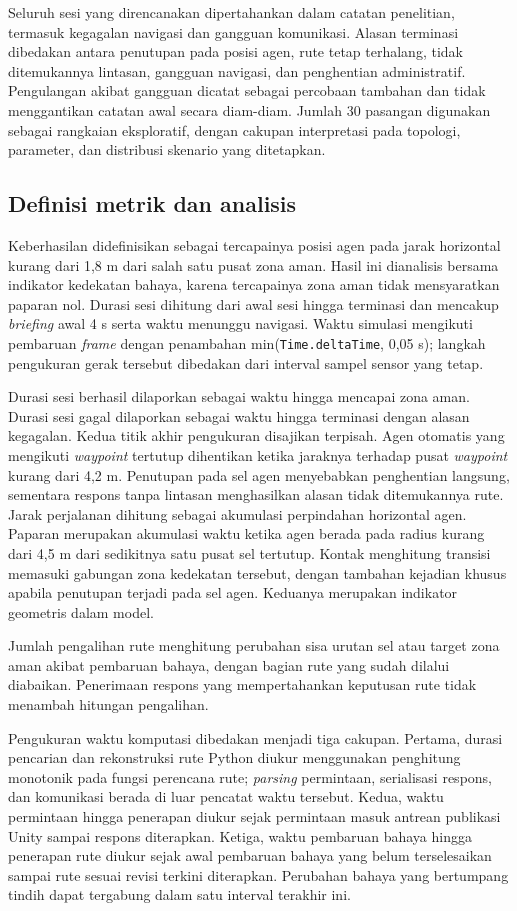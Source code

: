 \documentclass[10pt,a4paper]{article}
\begin{document}
Seluruh sesi yang direncanakan dipertahankan dalam catatan penelitian, termasuk kegagalan navigasi dan gangguan komunikasi. Alasan terminasi dibedakan antara penutupan pada posisi agen, rute tetap terhalang, tidak ditemukannya lintasan, gangguan navigasi, dan penghentian administratif. Pengulangan akibat gangguan dicatat sebagai percobaan tambahan dan tidak menggantikan catatan awal secara diam-diam. Jumlah 30 pasangan digunakan sebagai rangkaian eksploratif, dengan cakupan interpretasi pada topologi, parameter, dan distribusi skenario yang ditetapkan.

\subsection*{Definisi metrik dan analisis}
Keberhasilan didefinisikan sebagai tercapainya posisi agen pada jarak horizontal kurang dari 1,8 m dari salah satu pusat zona aman. Hasil ini dianalisis bersama indikator kedekatan bahaya, karena tercapainya zona aman tidak mensyaratkan paparan nol. Durasi sesi dihitung dari awal sesi hingga terminasi dan mencakup \emph{briefing} awal 4 s serta waktu menunggu navigasi. Waktu simulasi mengikuti pembaruan \emph{frame} dengan penambahan min(\texttt{Time.deltaTime}, 0,05 s); langkah pengukuran gerak tersebut dibedakan dari interval sampel sensor yang tetap.

Durasi sesi berhasil dilaporkan sebagai waktu hingga mencapai zona aman. Durasi sesi gagal dilaporkan sebagai waktu hingga terminasi dengan alasan kegagalan. Kedua titik akhir pengukuran disajikan terpisah. Agen otomatis yang mengikuti \emph{waypoint} tertutup dihentikan ketika jaraknya terhadap pusat \emph{waypoint} kurang dari 4,2 m. Penutupan pada sel agen menyebabkan penghentian langsung, sementara respons tanpa lintasan menghasilkan alasan tidak ditemukannya rute. Jarak perjalanan dihitung sebagai akumulasi perpindahan horizontal agen. Paparan merupakan akumulasi waktu ketika agen berada pada radius kurang dari 4,5 m dari sedikitnya satu pusat sel tertutup. Kontak menghitung transisi memasuki gabungan zona kedekatan tersebut, dengan tambahan kejadian khusus apabila penutupan terjadi pada sel agen. Keduanya merupakan indikator geometris dalam model.

Jumlah pengalihan rute menghitung perubahan sisa urutan sel atau target zona aman akibat pembaruan bahaya, dengan bagian rute yang sudah dilalui diabaikan. Penerimaan respons yang mempertahankan keputusan rute tidak menambah hitungan pengalihan.

Pengukuran waktu komputasi dibedakan menjadi tiga cakupan. Pertama, durasi pencarian dan rekonstruksi rute Python diukur menggunakan penghitung monotonik pada fungsi perencana rute; \emph{parsing} permintaan, serialisasi respons, dan komunikasi berada di luar pencatat waktu tersebut. Kedua, waktu permintaan hingga penerapan diukur sejak permintaan masuk antrean publikasi Unity sampai respons diterapkan. Ketiga, waktu pembaruan bahaya hingga penerapan rute diukur sejak awal pembaruan bahaya yang belum terselesaikan sampai rute sesuai revisi terkini diterapkan. Perubahan bahaya yang bertumpang tindih dapat tergabung dalam satu interval terakhir ini.
\end{document}
